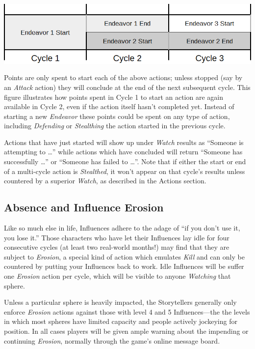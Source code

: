 \includegraphics[width=0.9\linewidth]{MultiCycle.png}

\noindent Points are only spent to start each of the above actions; unless stopped (say by an \emph{Attack} action) they will 
conclude at the end of the next subsequent cycle.  This figure illustrates how points spent in Cycle 1 to start an 
action are again available in Cycle 2, even if the action itself hasn't completed yet.  Instead of starting a new 
\emph{Endeavor} these points could be spent on any type of action, including \emph{Defending} or \emph{Stealthing} 
the action started in the previous cycle.

Actions that have just started will show up under \emph{Watch} results as ``Someone is attempting to \ldots'' while actions 
which have concluded will return ``Someone has successfully \ldots'' or ``Someone has failed to \ldots''.  Note that if either 
the start or end of a multi-cycle action is \emph{Stealthed}, it won't appear on that cycle's results unless countered by a 
superior \emph{Watch}, as described in the Actions section.

\subsection{Absence and Influence Erosion}
Like so much else in life, Influences adhere to the adage of ``if you don't use it, you lose it.''  Those characters who have 
let their Influences lay idle for four consecutive cycles (at least two real-world months!) may find that they are subject 
to \emph{Erosion}, a special kind of action which emulates \emph{Kill} and can only be countered by putting your Influences back 
to work.  Idle Influences will be suffer one \emph{Erosion} action per cycle, which will be visible to anyone \emph{Watching} that 
sphere.

Unless a particular sphere is heavily impacted, the Storytellers generally only enforce \emph{Erosion} actions against those with 
level 4 and 5 Influences---the the levels in which most spheres have limited capacity and people actively jockeying for position.  
In all cases players will be given ample warning about the impending or continuing \emph{Erosion}, normally through the game's 
online message board.
